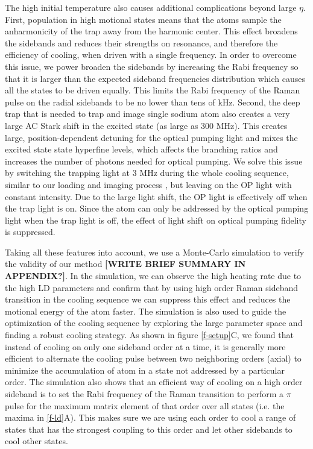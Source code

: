 \documentclass[aps,prl,twocolumn,groupedaddress]{revtex4-1}
\renewcommand{\fxnote}[1]{{\textbf{[#1]}}}
\begin{document}
The high initial temperature also causes additional complications beyond large $\eta$.
First, population in high motional states means that the atoms sample
the anharmonicity of the trap away from the harmonic center.
This effect broadens the sidebands and reduces their strengths on resonance,
and therefore the efficiency of cooling, when driven with a single frequency.
In order to overcome this issue, we power broaden the sidebands by increasing the Rabi frequency
so that it is larger than the expected sideband frequencies distribution
which causes all the states to be driven equally.
This limits the Rabi frequency of the Raman pulse on the radial sidebands to be no lower
than tens of kHz.
Second, the deep trap that is needed to trap and image single sodium atom also creates
a very large AC Stark shift in the excited state (as large as 300 MHz).
This creates large, position-dependent detuning for the optical pumping light and mixes the excited state state hyperfine levels,
which affects the branching ratios and increases the number of photons needed for optical pumping.
We solve this issue by switching the trapping light at 3 MHz
during the whole cooling sequence, similar to our loading and imaging process
\cite{Hutzler2017-LightShifts}, but leaving on the OP light with constant intensity.
Due to the large light shift, the OP light is effectively off when the trap light is on.
Since the atom can only be addressed by the optical pumping light when the trap light is off,
the effect of light shift on optical pumping fidelity is suppressed.

Taking all these features into account, we use a Monte-Carlo simulation to verify
the validity of our method \fxnote{WRITE BRIEF SUMMARY IN APPENDIX?}.
In the simulation, we can observe the high heating rate due to the high LD parameters
and confirm that by using high order Raman sideband transition in the cooling sequence we can
suppress this effect and reduces the motional energy of the atom faster.
The simulation is also used to guide the optimization of the cooling sequence by exploring the
large parameter space and finding a robust cooling strategy.
As shown in figure \ref{f-setup}C, we found that instead of cooling on only one sideband order
at a time, it is generally more efficient to alternate the cooling pulse between two
neighboring orders (axial) to minimize the accumulation of atom in a state
not addressed by a particular order.
The simulation also shows that an efficient way of cooling on a high order sideband is
to set the Rabi frequency of the Raman transition to perform a $\pi$ pulse for the maximum matrix element of that order over all states (i.e. the maxima in \ref{f-ld}A).
This makes sure we are using each order to cool a range of states that has the strongest
coupling to this order and let other sidebands to cool other states.
\end{document}
